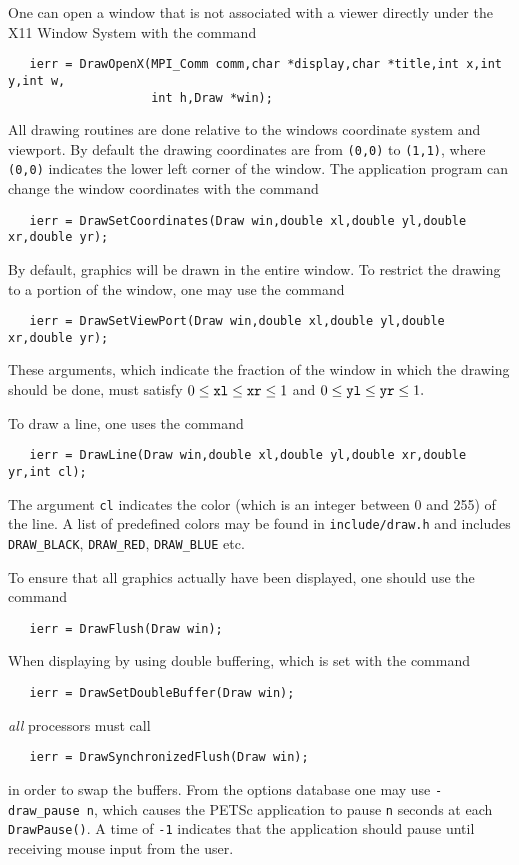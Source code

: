 One can open a window that is not associated with a viewer directly 
under the X11 Window System with the
command  
\begin{verbatim}
   ierr = DrawOpenX(MPI_Comm comm,char *display,char *title,int x,int y,int w,
                    int h,Draw *win);
\end{verbatim}
All drawing routines are done relative to the windows coordinate system 
and viewport. By default the drawing coordinates are from {\tt (0,0)} to 
{\tt (1,1)}, where {\tt (0,0)} indicates the lower left corner of the 
window. The application program can change the window coordinates with the 
command  
\begin{verbatim}
   ierr = DrawSetCoordinates(Draw win,double xl,double yl,double xr,double yr);
\end{verbatim}
By default, graphics will be drawn in the entire window. To restrict the 
drawing to a portion of the window, one may 
use the command 
\begin{verbatim}
   ierr = DrawSetViewPort(Draw win,double xl,double yl,double xr,double yr);
\end{verbatim}
These arguments, which indicate the fraction of the window in which the 
drawing should be done, must satisfy 
$ 0 \le {\tt xl} \le {\tt xr} \le 1 $ and $ 0 \le {\tt yl} \le {\tt yr} \le 1.$ 

To draw a line, one uses
 the command  
\begin{verbatim}
   ierr = DrawLine(Draw win,double xl,double yl,double xr,double yr,int cl);
\end{verbatim}
The argument {\tt cl} indicates the color (which is an integer between 0 and 255)
of the line. A list of predefined colors may be found in {\tt include/draw.h}
and includes {\tt DRAW\_BLACK}, {\tt DRAW\_RED}, {\tt DRAW\_BLUE} etc.

To ensure that all graphics actually have been displayed, one should use 
 the
command 
\begin{verbatim}
   ierr = DrawFlush(Draw win);
\end{verbatim}
When displaying by using double buffering, which is set with the
command  
\begin{verbatim}
   ierr = DrawSetDoubleBuffer(Draw win);
\end{verbatim}
{\em all} processors must call 
\begin{verbatim}
   ierr = DrawSynchronizedFlush(Draw win);
\end{verbatim}
in order to swap the buffers. From the options database one may use 
{\tt -draw\_pause n}, which  causes the PETSc application 
to pause {\tt n} seconds at each {\tt DrawPause()}. A time of {\tt -1}
indicates that the application should pause until receiving mouse 
input from the user.

